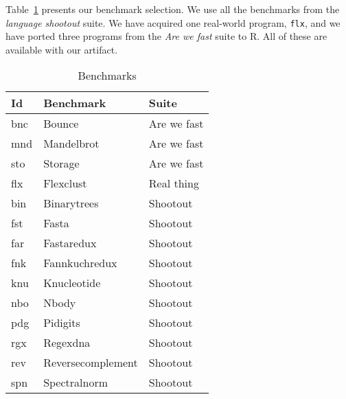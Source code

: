 \documentclass[review,creen,acmsmall]{acmart}
\renewcommand{\c}[1]{\lstinline |#1|\xspace}
\begin{document}
Table~\ref{table:bms} presents our benchmark selection. We use all the benchmarks
from the \emph{language shootout} suite. We have acquired one real-world program,
\c{flx}, and we have ported three programs from the \emph{Are we fast} suite to
R. All of these are available with our artifact.

\begin{table}[!h]
  \small
  \caption{Benchmarks}\label{table:bms}
  \begin{tabular}{lll}
    \toprule
    \bf Id&\bf Benchmark&\bf Suite\\
    \midrule
    bnc&Bounce&Are we fast\\
    mnd&Mandelbrot&Are we fast\\
    sto&Storage&Are we fast\\
    flx&Flexclust&Real thing\\
    bin&Binarytrees&Shootout\\
    fst&Fasta&Shootout\\
    far&Fastaredux&Shootout\\
    fnk&Fannkuchredux&Shootout\\
    knu&Knucleotide&Shootout\\
    nbo&Nbody&Shootout\\
    pdg&Pidigits&Shootout\\
    rgx&Regexdna&Shootout\\
    rev&Reversecomplement&Shootout\\
    spn&Spectralnorm&Shootout\\
    \bottomrule
  \end{tabular}
\end{table}
\end{document}
